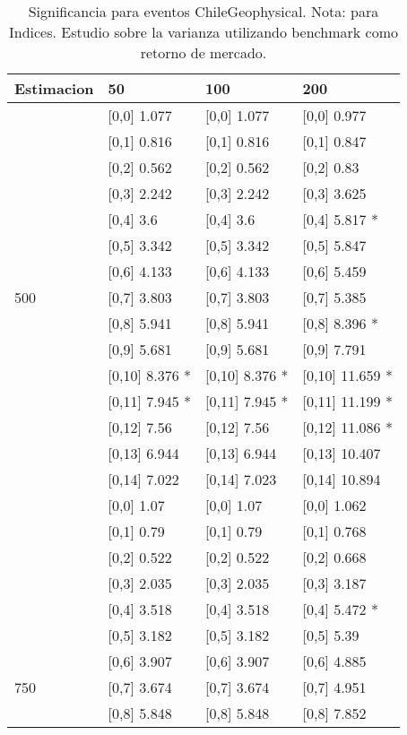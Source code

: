 \begin{table}

\caption{Significancia para eventos ChileGeophysical. Nota: para Indices. Estudio sobre la varianza utilizando benchmark como retorno de mercado.}
\centering
\begin{tabular}[t]{llll}
\toprule
Estimacion & 50 & 100 & 200\\
\midrule
 & {}[0,0] 1.077 & {}[0,0] 1.077 & {}[0,0] 0.977\\
 & {}[0,1] 0.816 & {}[0,1] 0.816 & {}[0,1] 0.847\\
 & {}[0,2] 0.562 & {}[0,2] 0.562 & {}[0,2] 0.83\\
 & {}[0,3] 2.242 & {}[0,3] 2.242 & {}[0,3] 3.625\\
 & {}[0,4] 3.6 & {}[0,4] 3.6 & {}[0,4] 5.817 *\\
\addlinespace
 & {}[0,5] 3.342 & {}[0,5] 3.342 & {}[0,5] 5.847\\
 & {}[0,6] 4.133 & {}[0,6] 4.133 & {}[0,6] 5.459\\
500 & {}[0,7] 3.803 & {}[0,7] 3.803 & {}[0,7] 5.385\\
 & {}[0,8] 5.941 & {}[0,8] 5.941 & {}[0,8] 8.396 *\\
 & {}[0,9] 5.681 & {}[0,9] 5.681 & {}[0,9] 7.791\\
\addlinespace
 & {}[0,10] 8.376 * & {}[0,10] 8.376 * & {}[0,10] 11.659 *\\
 & {}[0,11] 7.945 * & {}[0,11] 7.945 * & {}[0,11] 11.199 *\\
 & {}[0,12] 7.56 & {}[0,12] 7.56 & {}[0,12] 11.086 *\\
 & {}[0,13] 6.944 & {}[0,13] 6.944 & {}[0,13] 10.407\\
 & {}[0,14] 7.022 & {}[0,14] 7.023 & {}[0,14] 10.894\\
\addlinespace
 & {}[0,0] 1.07 & {}[0,0] 1.07 & {}[0,0] 1.062\\
 & {}[0,1] 0.79 & {}[0,1] 0.79 & {}[0,1] 0.768\\
 & {}[0,2] 0.522 & {}[0,2] 0.522 & {}[0,2] 0.668\\
 & {}[0,3] 2.035 & {}[0,3] 2.035 & {}[0,3] 3.187\\
 & {}[0,4] 3.518 & {}[0,4] 3.518 & {}[0,4] 5.472 *\\
\addlinespace
 & {}[0,5] 3.182 & {}[0,5] 3.182 & {}[0,5] 5.39\\
 & {}[0,6] 3.907 & {}[0,6] 3.907 & {}[0,6] 4.885\\
750 & {}[0,7] 3.674 & {}[0,7] 3.674 & {}[0,7] 4.951\\
 & {}[0,8] 5.848 & {}[0,8] 5.848 & {}[0,8] 7.852\\

\end{tabular}
\end{table}
